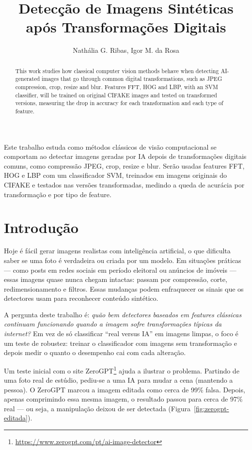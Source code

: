 \documentclass[12pt]{article}
\title{Detecção de Imagens Sintéticas após Transformações Digitais}
\author{Nathália G. Ribas\inst{1}, Igor M. da Rosa\inst{1}}
\begin{document}
\maketitle

\begin{abstract}
This work studies how classical computer vision methods behave when detecting AI-generated images that go through common digital transformations, such as JPEG compression, crop, resize and blur. Features FFT, HOG and LBP, with an SVM classifier, will be trained on original CIFAKE images and tested on transformed versions, measuring the drop in accuracy for each transformation and each type of feature.
\end{abstract}

\begin{resumo}
Este trabalho estuda como métodos clássicos de visão computacional se comportam ao detectar imagens geradas por IA depois de transformações digitais comuns, como compressão JPEG, crop, resize e blur. Serão usadas features FFT, HOG e LBP com um classificador SVM, treinados em imagens originais do CIFAKE e testados nas versões transformadas, medindo a queda de acurácia por transformação e por tipo de feature.
\end{resumo}

\section{Introdução}

Hoje é fácil gerar imagens realistas com inteligência artificial, o que dificulta saber se uma foto é verdadeira ou criada por um modelo. Em situações práticas --- como posts em redes sociais em período eleitoral ou anúncios de imóveis --- essas imagens quase nunca chegam intactas: passam por compressão, corte, redimensionamento e filtros. Essas mudanças podem enfraquecer os sinais que os detectores usam para reconhecer conteúdo sintético.

A pergunta deste trabalho é: \emph{quão bem detectores baseados em features clássicas continuam funcionando quando a imagem sofre transformações típicas da internet?} Em vez de só classificar ``real versus IA'' em imagens limpas, o foco é um teste de robustez: treinar o classificador com imagens sem transformação e depois medir o quanto o desempenho cai com cada alteração.

Um teste inicial com o site ZeroGPT\footnote{\url{https://www.zerogpt.com/pt/ai-image-detector}} ajuda a ilustrar o problema. Partindo de uma foto real de estúdio, pediu-se a uma IA para mudar a cena (mantendo a pessoa). O ZeroGPT marcou a imagem editada como cerca de 99\% falsa. Depois, apenas comprimindo essa mesma imagem, o resultado passou para cerca de 97\% real --- ou seja, a manipulação deixou de ser detectada (Figura~\ref{fig:zerogpt-editada}).
\end{document}
